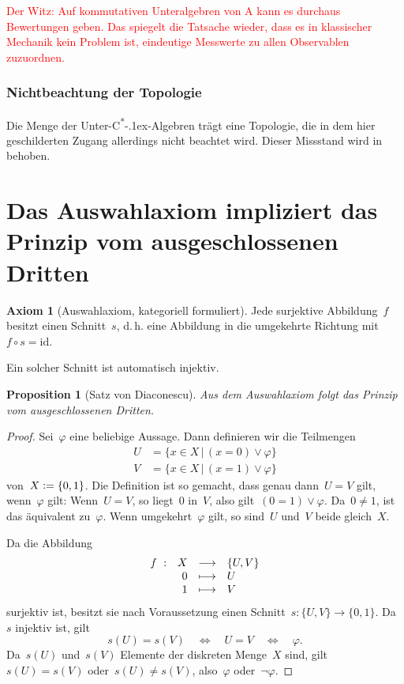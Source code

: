 \documentclass[a4paper,ngerman,12pt]{scrartcl}
\theoremstyle{definition}
\newtheorem{axiom}[defn]{Axiom}
\theoremstyle{plain}
\newtheorem{prop}[defn]{Proposition}
\theoremstyle{remark}
\newcommand{\CC}{\mathbb{C}}
\newcommand{\C}{\mathcal{C}}
\newcommand{\id}{\mathrm{id}}
\newcommand{\csalgebren}{C\textsuperscript{*}\kern-.1ex-Alge\-bren}
\renewcommand{\_}{\mathpunct{.}\,}
\newcommand{\?}{\,{:}\,}
\newcommand{\XXX}[1]{\textcolor{red}{#1}}
\newcommand{\defeq}{\vcentcolon=}
\begin{document}

\XXX{Der Witz: Auf kommutativen Unteralgebren von A kann es durchaus
Bewertungen geben. Das spiegelt die Tatsache wieder, dass es in
klassischer Mechanik kein Problem ist, eindeutige Messwerte zu allen
Observablen zuzuordnen.}


\subsubsection*{Nichtbeachtung der Topologie}

Die Menge der Unter-\csalgebren{} trägt eine Topologie, die in dem hier
geschilderten Zugang allerdings nicht beachtet wird. Dieser Missstand wird
in~\cite{henry:bohr} behoben.



\appendix
\section{Das Auswahlaxiom impliziert das Prinzip vom ausgeschlossenen Dritten}

\label{appendix:axc}%
\begin{axiom}[Auswahlaxiom, kategoriell formuliert]Jede surjektive
Abbildung~$f$ besitzt einen Schnitt~$s$, d.\,h. eine Abbildung in die
umgekehrte Richtung mit~$f \circ s = \id$.\end{axiom}
Ein solcher Schnitt ist automatisch injektiv.

\begin{prop}[Satz von Diaconescu]Aus dem Auswahlaxiom folgt das Prinzip vom ausgeschlossenen
Dritten.\end{prop}
\begin{proof}Sei~$\varphi$ eine beliebige Aussage. Dann definieren wir die
Teilmengen
\begin{align*}
  U &= \{ x \in X \,|\, (x = 0) \vee \varphi \} \\
  V &= \{ x \in X \,|\, (x = 1) \vee \varphi \}
\end{align*}
von~$X \defeq \{ 0, 1 \}$. Die Definition ist so gemacht, dass genau dann~$U = V$
gilt, wenn~$\varphi$ gilt: Wenn~$U = V$, so liegt~$0$ in~$V$, also gilt~$(0 = 1)
\vee \varphi$. Da~$0 \neq 1$, ist das äquivalent zu~$\varphi$. Wenn umgekehrt~$\varphi$
gilt, so sind~$U$ und~$V$ beide gleich~$X$.

Da die Abbildung
\[ \begin{array}{@{}rrcl@{}}
  f\ : & X &\longrightarrow& \{U,V\} \\
  & 0 &\longmapsto& U \\
  & 1 &\longmapsto& V
\end{array} \]
surjektiv ist, besitzt sie nach Voraussetzung
einen Schnitt~$s : \{U,V\} \to \{0,1\}$. Da~$s$ injektiv ist, gilt
\[ s(U) = s(V) \quad\Longleftrightarrow\quad U = V
\quad\Longleftrightarrow\quad \varphi. \]
Da~$s(U)$ und~$s(V)$ Elemente der diskreten Menge~$X$ sind, gilt~$s(U) = s(V)$
oder~$s(U) \neq s(V)$, also~$\varphi$ oder~$\neg\varphi$.
\end{proof}
\end{document}
